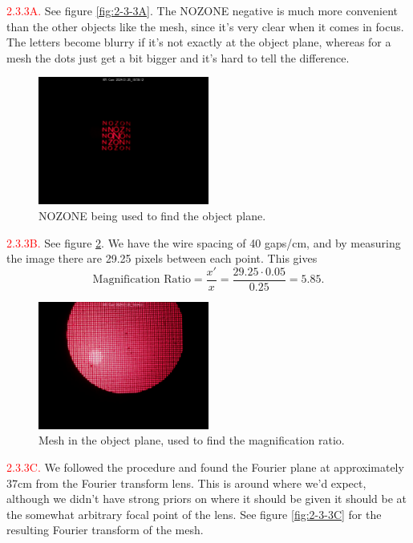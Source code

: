 \documentclass[letterpaper, reqno,11pt]{article}
\begin{document}
\noindent \textcolor{red}{2.3.3A.} See figure \ref{fig:2-3-3A}. The NOZONE negative is much more convenient than the other objects like the mesh, since it's very clear when it comes in focus. The letters become blurry if it's not exactly at the object plane, whereas for a mesh the dots just get a bit bigger and it's hard to tell the difference.

\begin{figure}[tb]
    \centering
    \includegraphics[width=0.5\textwidth]{Fourier/2A/media/im_0071_20240126_185912.jpg}
    \caption{NOZONE being used to find the object plane.}
    \label{fig:2-3-2A}
\end{figure}

\noindent \textcolor{red}{2.3.3B.} See figure \ref{fig:2-3-3B}. We have the wire spacing of 40 gaps/cm, and by measuring the image there are 29.25 pixels between each point. This gives
\[
\text{Magnification Ratio} = \frac{x'}{x}=\frac{29.25\cdot 0.05}{0.25}=5.85
.\]

\begin{figure}[tb]
    \centering
    \includegraphics[width=0.5\textwidth]{Fourier/2B/media/im_0076_20240126_190401.jpg}
    \caption{Mesh in the object plane, used to find the magnification ratio.}
    \label{fig:2-3-3B}
\end{figure}

\noindent \textcolor{red}{2.3.3C.} We followed the procedure and found the Fourier plane at approximately 37cm from the Fourier transform lens. This is around where we'd expect, although we didn't have strong priors on where it should be given it should be at the somewhat arbitrary focal point of the lens. See figure \ref{fig:2-3-3C} for the resulting Fourier transform of the mesh.
\end{document}
